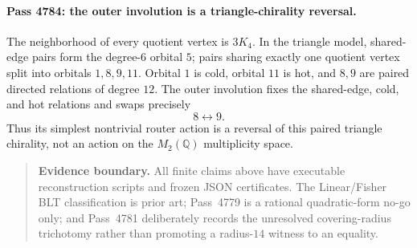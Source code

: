 \paragraph{Pass 4784: the outer involution is a triangle-chirality reversal.}
The neighborhood of every quotient vertex is $3K_4$.  In the triangle model, shared-edge pairs form the degree-$6$ orbital $5$; pairs sharing exactly one quotient vertex split into orbitals $1,8,9,11$.  Orbital $1$ is cold, orbital $11$ is hot, and $8,9$ are paired directed relations of degree $12$.  The outer involution fixes the shared-edge, cold, and hot relations and swaps precisely
\[
 \boxed{8\longleftrightarrow9}.
\]
Thus its simplest nontrivial router action is a reversal of this paired triangle chirality, not an action on the $M_2(\mathbb Q)$ multiplicity space.

\begin{quote}\small
\textbf{Evidence boundary.} All finite claims above have executable reconstruction scripts and frozen JSON certificates.  The Linear/Fisher BLT classification is prior art; Pass~4779 is a rational quadratic-form no-go only; and Pass~4781 deliberately records the unresolved covering-radius trichotomy rather than promoting a radius-$14$ witness to an equality.
\end{quote}
